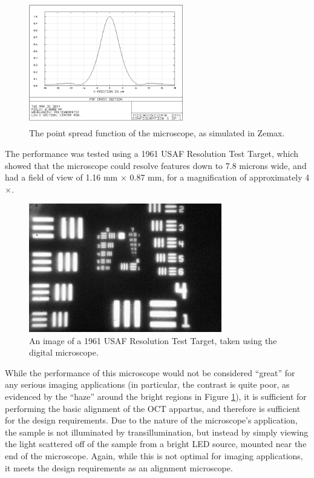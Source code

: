 \begin{figure}[h!]
\centering
\includegraphics[width=0.6\textwidth]{Images/Zemax/microscope_psf_2.png}
\caption[The point spread function of the microscope, as simulated in Zemax.]{The point spread function of the microscope, as simulated in Zemax.}
\end{figure}

The performance was tested using a 1961 USAF Resolution Test Target, which showed that the microscope could resolve features down to 7.8 microns wide, and had a field of view of 1.16 mm $\times$ 0.87 mm, for a magnification of approximately 4$\times$.

\begin{figure}[h!]

\centering
\includegraphics[width=0.75\textwidth]{Images/Microscope/target2.png}
\caption{An image of a 1961 USAF Resolution Test Target, taken using the digital microscope. \label{fig:usaf}}
\end{figure}

While the performance of this microscope would not be considered ``great'' for any serious imaging applications (in particular, the contrast is quite poor, as evidenced by the ``haze'' around the bright regions in Figure \ref{fig:usaf}), it is sufficient for performing the basic alignment of the OCT appartus, and therefore is sufficient for the design requirements. Due to the nature of the microscope's application, the sample is not illuminated by transillumination, but instead by simply viewing the light scattered off of the sample from a bright LED source, mounted near the end of the microscope. Again, while this is not optimal for imaging applications, it meets the design requirements as an alignment microscope.

